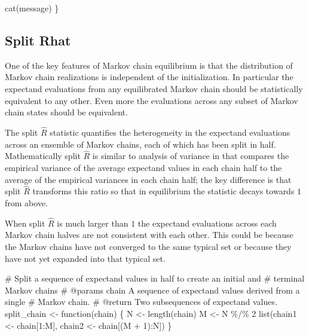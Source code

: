 \documentclass[
  letterpaper,
  DIV=11,
  numbers=noendperiod]{scrartcl}
\newenvironment{Shaded}{\begin{snugshade}}{\end{snugshade}}
\newcommand{\BuiltInTok}[1]{\textcolor[rgb]{0.00,0.23,0.31}{#1}}
\newcommand{\CommentTok}[1]{\textcolor[rgb]{0.37,0.37,0.37}{#1}}
\newcommand{\DecValTok}[1]{\textcolor[rgb]{0.68,0.00,0.00}{#1}}
\newcommand{\NormalTok}[1]{\textcolor[rgb]{0.00,0.23,0.31}{#1}}
\newcommand{\OperatorTok}[1]{\textcolor[rgb]{0.37,0.37,0.37}{#1}}
\begin{document}
\begin{Shaded}
\begin{Highlighting}[]
\NormalTok{  cat(message)}
\NormalTok{\}}
\end{Highlighting}
\end{Shaded}

\hypertarget{split-rhat}{%
\subsection{Split Rhat}\label{split-rhat}}

One of the key features of Markov chain equilibrium is that the
distribution of Markov chain realizations is independent of the
initialization. In particular the expectand evaluations from any
equilibrated Markov chain should be statistically equivalent to any
other. Even more the evaluations across any subset of Markov chain
states should be equivalent.

The split \(\hat{R}\) statistic quantifies the heterogeneity in the
expectand evaluations across an ensemble of Markov chains, each of which
has been split in half. Mathematically split \(\hat{R}\) is similar to
analysis of variance in that compares the empirical variance of the
average expectand values in each chain half to the average of the
empirical variances in each chain half; the key difference is that split
\(\hat{R}\) transforms this ratio so that in equilibrium the statistic
decays towards \(1\) from above.

When split \(\hat{R}\) is much larger than \(1\) the expectand
evaluations across each Markov chain halves are not consistent with each
other. This could be because the Markov chains have not converged to the
same typical set or because they have not yet expanded into that typical
set.

\begin{Shaded}
\begin{Highlighting}[]
\CommentTok{\# Split a sequence of expectand values in half to create an initial and }
\CommentTok{\# terminal Markov chains}
\CommentTok{\# @params chain A sequence of expectand values derived from a single }
\CommentTok{\#               Markov chain.}
\CommentTok{\# @return Two subsequences of expectand values.}
\NormalTok{split\_chain }\OperatorTok{\textless{}{-}}\NormalTok{ function(chain) \{}
\NormalTok{  N }\OperatorTok{\textless{}{-}}\NormalTok{ length(chain)}
\NormalTok{  M }\OperatorTok{\textless{}{-}}\NormalTok{ N }\OperatorTok{\%/\%} \DecValTok{2}
  \BuiltInTok{list}\NormalTok{(chain1 }\OperatorTok{\textless{}{-}}\NormalTok{ chain[}\DecValTok{1}\NormalTok{:M], chain2 }\OperatorTok{\textless{}{-}}\NormalTok{ chain[(M }\OperatorTok{+} \DecValTok{1}\NormalTok{):N])}
\NormalTok{\}}
\end{Highlighting}
\end{Shaded}
\end{document}
